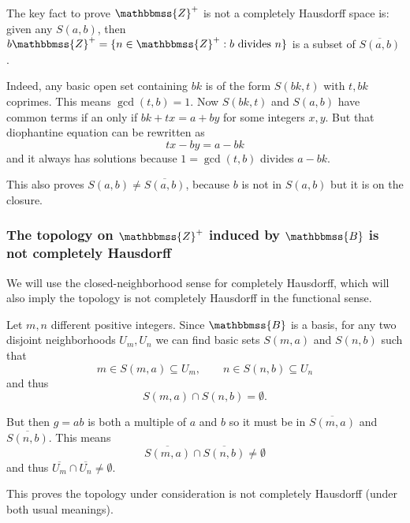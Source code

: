 \documentclass[12pt]{article}
\newcommand{\Z}{\mathbbmss{Z}}
\newcommand{\B}{\mathbbmss{B}}
\begin{document}
The key fact to prove $\Z^+$ is not a completely Hausdorff space is: given any $S(a,b)$, then $b\Z^+ = \{n \in \Z^+ : b \mbox{ divides }n \}$ is a subset of $\overline{S(a,b)}$.

Indeed, any basic open set containing $bk$ is of the form $S(bk,t)$ with $t,bk$ coprimes. This means $\gcd(t,b)=1$. Now $S(bk,t)$ and $S(a,b)$ have common terms if an only if $bk+tx = a+by$ for some integers $x,y$. But that diophantine equation can be rewritten as
\[ tx - by = a-bk\]
and it always has solutions because $1=\gcd(t,b)$ divides $a-bk$.

This also proves  $S(a,b)\neq \overline{S(a,b)}$, because $b$ is not in $S(a,b)$ but it is on the closure.

\subsubsection*{The topology on $\Z^+$ induced by $\B$ is not completely Hausdorff}
We will use the closed-neighborhood sense for completely Hausdorff, which will also imply the topology is not completely Hausdorff in the functional sense.

Let $m,n$ different positive integers. Since $\B$ is a basis, for any two disjoint neighborhoods $U_m, U_n$ we can find basic sets $S(m,a)$ and $S(n,b)$ such that
\[m\in S(m,a)\subseteq U_m,\qquad n\in S(n,b)\subseteq U_n\]
and thus 
\[S(m,a)\cap S(n,b)=\emptyset.\]

But then $g=ab$ is both a multiple of $a$ and $b$ so it must be in $\overline{S(m,a)}$ and $\overline{S(n,b)}$. This means
\[\overline{S(m,a)}\cap\overline{S(n,b)}\neq\emptyset\]
and thus $\overline{U_m}\cap \overline{U_n}\neq\emptyset$.

This proves the topology under consideration is not completely 
Hausdorff (under both usual meanings).
\end{document}

